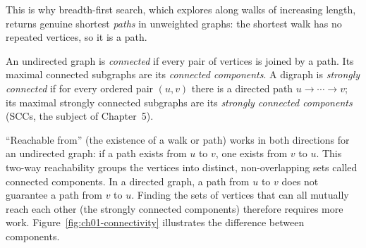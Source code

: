 This is why breadth-first search, which explores along walks of increasing length, returns genuine shortest \emph{paths} in unweighted graphs: the shortest walk has no repeated vertices, so it is a path.

\begin{definition}[Connectivity]
\label{ch01:def-connectivity}
An undirected graph is \emph{connected} if every pair of vertices is joined by a
path. Its maximal connected subgraphs are its \emph{connected components}. A
digraph is \emph{strongly connected} if for every ordered pair $(u,v)$ there is
a directed path $u \to \cdots \to v$; its maximal strongly connected subgraphs
are its \emph{strongly connected components} (SCCs, the subject of
Chapter~5).
\end{definition}

``Reachable from'' (the existence of a walk or path) works in both directions for an undirected graph: if a path exists from $u$ to $v$, one exists from $v$ to $u$. This two-way reachability groups the vertices into distinct, non-overlapping sets called connected components. In a directed graph, a path from $u$ to $v$ does not guarantee a path from $v$ to $u$. Finding the sets of vertices that can all mutually reach each other (the strongly connected components) therefore requires more work. Figure~\ref{fig:ch01-connectivity} illustrates the difference between components.

